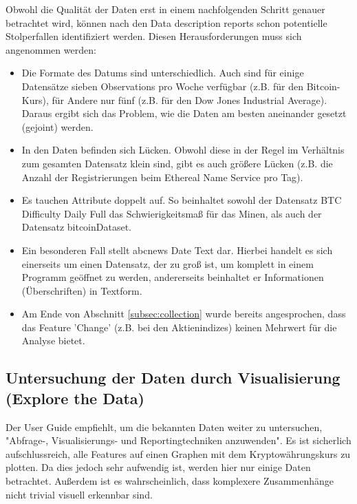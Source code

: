 Obwohl die Qualität der Daten erst in einem nachfolgenden Schritt genauer betrachtet wird, können nach den Data description reports schon potentielle Stolperfallen identifiziert werden. Diesen Herausforderungen muss sich angenommen werden:
\begin{itemize}
\item Die Formate des Datums sind unterschiedlich. Auch sind für einige Datensätze sieben Observations pro Woche verfügbar (z.B. für den Bitcoin-Kurs), für Andere nur fünf (z.B. für den Dow Jones Industrial Average). Daraus ergibt sich das Problem, wie die Daten am besten aneinander gesetzt (gejoint) werden.
\item In den Daten befinden sich Lücken. Obwohl diese in der Regel im Verhältnis zum gesamten Datensatz klein sind, gibt es auch größere Lücken (z.B. die Anzahl der Registrierungen beim Ethereal Name Service pro Tag).
\item Es tauchen Attribute doppelt auf. So beinhaltet sowohl der Datensatz BTC \textunderscore Difficulty \textunderscore Daily \textunderscore Full das Schwierigkeitsmaß für das Minen, als auch der Datensatz bitcoinDataset. 
\item Ein besonderen Fall stellt abcnews \textunderscore Date \textunderscore Text dar. Hierbei handelt es sich einerseits um einen Datensatz, der zu groß ist, um komplett in einem Programm geöffnet zu werden, andererseits beinhaltet er Informationen (Überschriften) in Textform.
\item Am Ende von Abschnitt \ref{subsec:collection} wurde bereits angesprochen, dass das Feature 'Change' (z.B. bei den Aktienindizes) keinen Mehrwert für die Analyse bietet.
\end{itemize}

\subsection{Untersuchung der Daten durch Visualisierung (Explore the Data)} \label{subsec:explore}
Der User Guide empfiehlt, um die bekannten Daten weiter zu untersuchen, "Abfrage-, Visualisierungs- und Reportingtechniken anzuwenden"\citep[S.~40; eigene Übersetzung]{chapman_crisp-dm_2000}. Es ist sicherlich aufschlussreich, alle Features auf einen Graphen mit dem Kryptowährungskurs zu plotten. Da dies jedoch sehr aufwendig ist, werden hier nur einige Daten betrachtet. Außerdem ist es wahrscheinlich, dass komplexere Zusammenhänge nicht trivial visuell erkennbar sind.\par

